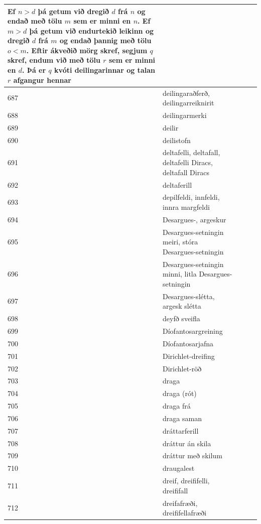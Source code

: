\begin{longtable}{p{}|p{}|p{}|p{}|p{}}
Ef $n > d$ þá getum við dregið $d$ frá $n$ og endað með tölu $m$ sem er minni en $n$. Ef $m>d$ þá getum við endurtekið leikinn og dregið $d$ frá $m$ og endað þannig með tölu $o<m$. Eftir ákveðið mörg skref, segjum $q$ skref, endum við með tölu $r$ sem er minni en $d$. Þá er $q$ kvóti deilingarinnar og talan $r$ afgangur hennar & \\
\hline
687 & deilingaraðferð, deilingarreiknirit &  &  &  \\
\hline
688 & deilingarmerki &  &  &  \\
\hline
689 & deilir &  &  &  \\
\hline
690 & deilistofn &  &  &  \\
\hline
691 & deltafelli, deltafall, deltafelli Diracs, deltafall Diracs &  &  &  \\
\hline
692 & deltaferill &  &  &  \\
\hline
693 & depilfeldi, innfeldi, innra margfeldi &  &  &  \\
\hline
694 & Desargues-, argeskur &  &  &  \\
\hline
695 & Desargues-setningin meiri, stóra Desargues-setningin &  &  &  \\
\hline
696 & Desargues-setningin minni, litla Desargues-setningin &  &  &  \\
\hline
697 & Desargues-slétta, argesk slétta &  &  &  \\
\hline
698 & deyfð sveifla &  &  &  \\
\hline
699 & Díofantosargreining &  &  &  \\
\hline
700 & Díofantosarjafna &  &  &  \\
\hline
701 & Dirichlet-dreifing &  &  &  \\
\hline
702 & Dirichlet-röð &  &  &  \\
\hline
703 & draga &  &  &  \\
\hline
704 & draga (rót) &  &  &  \\
\hline
705 & draga frá &  &  &  \\
\hline
706 & draga saman &  &  &  \\
\hline
707 & dráttarferill &  &  &  \\
\hline
708 & dráttur án skila &  &  &  \\
\hline
709 & dráttur með skilum &  &  &  \\
\hline
710 & draugalest &  &  &  \\
\hline
711 & dreif, dreififelli, dreififall &  &  &  \\
\hline
712 & dreifafræði, dreififellafræði &  &  &  \\

\end{longtable}
